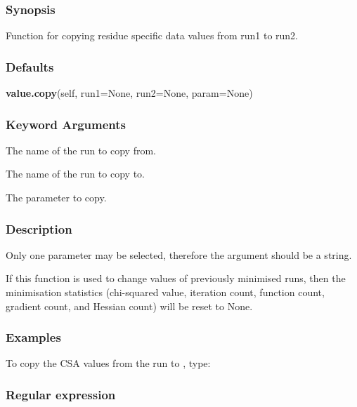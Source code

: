   
 \subsubsection{Synopsis} 

 Function for copying residue specific data values from run1 to run2. 
  

  
 \subsubsection{Defaults} 

 \textsf{\textbf{value.copy}(self, run1=None, run2=None, param=None)} 

  
 \subsubsection{Keyword Arguments} 

   The name of the run to copy from.   

   The name of the run to copy to.   

   The parameter to copy.  

  

  
 \subsubsection{Description} 

 Only one parameter may be selected, therefore the  argument should be a string. 
  

 If this function is used to change values of previously minimised runs, then the minimisation statistics (chi-squared value, iteration count, function count, gradient count, and Hessian count) will be reset to None. 
  

  
 \subsubsection{Examples} 

 To copy the CSA values from the run  to , type: 
  


  
 \subsubsection{Regular expression} 

